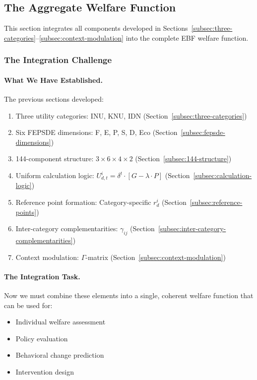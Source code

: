 \subsection{The Aggregate Welfare Function}
\label{subsec:aggregate-welfare}


This section integrates all components developed in Sections~\ref{subsec:three-categories}--\ref{subsec:context-modulation} 
into the complete EBF welfare function.

\subsubsection{The Integration Challenge}

\paragraph{What We Have Established.}
The previous sections developed:
\begin{enumerate}
\item Three utility categories: INU, KNU, IDN (Section~\ref{subsec:three-categories})
\item Six FEPSDE dimensions: F, E, P, S, D, Eco (Section~\ref{subsec:fepsde-dimensions})
\item 144-component structure: $3 \times 6 \times 4 \times 2$ (Section~\ref{subsec:144-structure})
\item Uniform calculation logic: $U^i_{d,t} = \delta^t \cdot [G - \lambda \cdot P]$ (Section~\ref{subsec:calculation-logic})
\item Reference point formation: Category-specific $r^i_d$ (Section~\ref{subsec:reference-points})
\item Inter-category complementarities: $\gamma_{ij}$ (Section~\ref{subsec:inter-category-complementarities})
\item Context modulation: $\Gamma$-matrix (Section~\ref{subsec:context-modulation})
\end{enumerate}

\paragraph{The Integration Task.}
Now we must combine these elements into a single, coherent welfare function 
that can be used for:
\begin{itemize}
\item Individual welfare assessment
\item Policy evaluation
\item Behavioral change prediction
\item Intervention design
\end{itemize}

